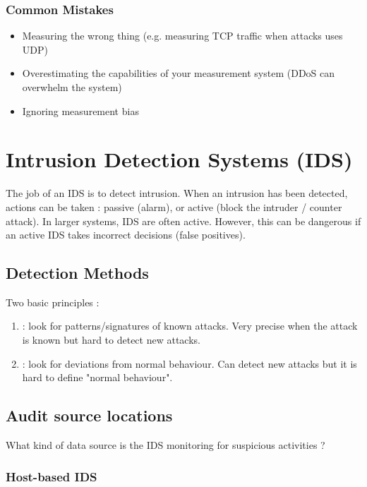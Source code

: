 \subsection{Common Mistakes}

\begin{itemize}
    \item Measuring the wrong thing (e.g. measuring TCP traffic when attacks uses UDP)
    \item Overestimating the capabilities of your measurement system (DDoS can overwhelm the system)
    \item Ignoring measurement bias
\end{itemize}

\chapter{Intrusion Detection Systems (IDS)}

The job of an IDS is to detect intrusion. When an intrusion has been detected, actions can be taken : passive (alarm), or active (block the intruder / counter attack). In larger systems, IDS are often active. However, this can be dangerous if an active IDS takes incorrect decisions (false positives).

\section{Detection Methods}

Two basic principles :
\begin{enumerate}
    \item {} : look for patterns/signatures of known attacks. Very precise when the attack is known but hard to detect new attacks.
    \item {} : look for deviations from normal behaviour. Can detect new attacks but it is hard to define "normal behaviour".
\end{enumerate}

\section{Audit source locations}

What kind of data source is the IDS monitoring for suspicious activities ?

\subsection{Host-based IDS}

